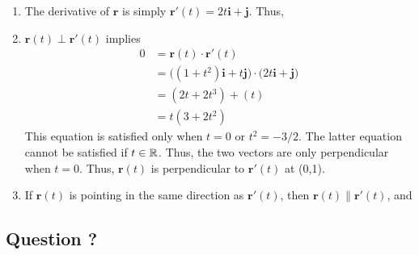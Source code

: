 \documentclass{article}
\begin{document}
\begin{enumerate}
\item The derivative of $\textbf{r}$ is simply
\(
  \mathbf{r}'(t) = 2t \mathbf{i} + \mathbf{j}.
\)
Thus,
\BEN
\item \(
  \mathbf{r}(t) \perp  \mathbf{r}'(t)
\)
implies
\begin{align*}
  0& = \mathbf{r}(t) \cdot  \mathbf{r}'(t) \\
  &= \big((1+t^2) \mathbf{i} + t\mathbf{j} \big) \cdot \big(2t \mathbf{i} + \mathbf{j}\big) \\
  &= (2t+2t^3) + (t)\\
  &= t(3+2t^2)
\end{align*}
This equation is satisfied only when $t=0$ or $t^2 = -3/2$. The latter equation cannot be satisfied if $t\in\mathbb{R}$. Thus, the two vectors are only perpendicular when $t=0$. Thus,  \(\mathbf{r}(t)\) is perpendicular to \(\mathbf{r}'(t)\) at (0,1). 
\item If \(\mathbf{r}(t)\) is pointing in the same direction as \(\mathbf{r}'(t)\), then \(\mathbf{r}(t) \parallel  \mathbf{r}'(t)\), and 
\EEN
\end{enumerate} %

\subsection*{Question ?}
\end{document}
